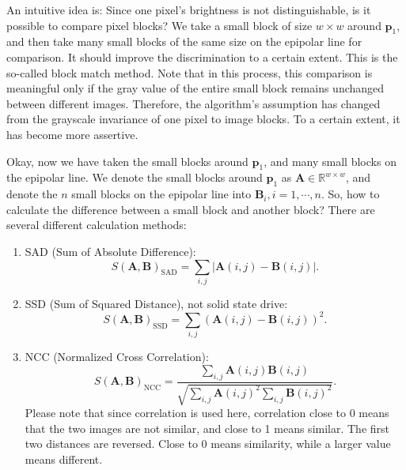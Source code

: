 An intuitive idea is: Since one pixel's brightness is not distinguishable, is it possible to compare pixel blocks? We take a small block of size $w \times w$ around $\mathbf{p}_1$, and then take many small blocks of the same size on the epipolar line for comparison. It should improve the discrimination to a certain extent. This is the so-called block match method. Note that in this process, this comparison is meaningful only if the gray value of the entire small block remains unchanged between different images. Therefore, the algorithm's assumption has changed from the grayscale invariance of one pixel to image blocks. To a certain extent, it has become more assertive.

Okay, now we have taken the small blocks around $\mathbf{p}_1$, and many small blocks on the epipolar line. We denote the small blocks around $\mathbf{p}_1$ as $\mathbf{A} \in \mathbb{R}^{w \times w}$, and denote the $n$ small blocks on the epipolar line into $\mathbf{B}_i, i=1, \cdots, n$. So, how to calculate the difference between a small block and another block? There are several different calculation methods:

\begin{enumerate}
	\item SAD (Sum of Absolute Difference):
	\begin{equation}
		S( \mathbf{A}, \mathbf{B} )_{\mathrm{SAD}} = \sum_{i,j} | \mathbf{A}(i,j) - \mathbf{B}(i,j) |.
	\end{equation}
	\item SSD (Sum of Squared Distance), not solid state drive:
	\begin{equation}
		S( \mathbf{A}, \mathbf{B} )_{\mathrm{SSD}} = \sum_{i,j} \left( \mathbf{A}(i,j) - \mathbf{B}(i,j) \right)^2.
	\end{equation}
	\item NCC (Normalized Cross Correlation):
	\begin{equation}
		S( \mathbf{A}, \mathbf{B} )_{\mathrm{NCC}} = \frac{{\sum\limits_{i,j} {\mathbf{A}(i,j)\mathbf{B}(i,j)} }}{{\sqrt {\sum\limits_{i,j} {\mathbf{A}{{(i,j)}^2}\sum\limits_{i,j} {\mathbf{B}{{(i,j)}^2}} } } }}.
	\end{equation}
	Please note that since correlation is used here, correlation close to 0 means that the two images are not similar, and close to 1 means similar. The first two distances are reversed. Close to 0 means similarity, while a larger value means different.
\end{enumerate}

